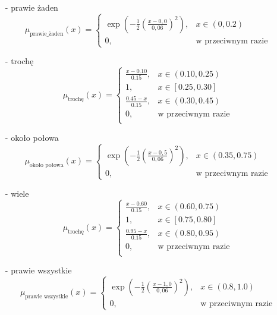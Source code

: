\documentclass{article}
\begin{document}
\begin{itemize}
    \item[-] prawie żaden
        \begin{equation}
            \mu_{\text{prawie\_żaden}}(x) =
        \begin{cases}
        \exp\left( -\frac{1}{2} \left( \frac{x - 0{,}0}{0,06} \right)^2 \right), & x \in (0, 0.2) \\
        0, & \text{w przeciwnym razie}
        \end{cases}
        \end{equation}
    \item[-] trochę
        \begin{equation}
            \mu_{\text{trochę}}(x) =
            \begin{cases}
            \frac{x - 0.10}{0.15}, & x \in (0.10, 0.25) \\
            1, & x \in [0.25, 0.30] \\
            \frac{0.45 - x}{0.15}, & x \in (0.30, 0.45)\\
            0, & \text{w przeciwnym razie} \\
            \end{cases}
        \end{equation}
    \item[-] około połowa
        \begin{equation}
        \mu_{\text{około połowa}}(x) =
        \begin{cases}
        \exp\left( -\frac{1}{2} \left( \frac{x - 0{,}5}{0,06} \right)^2 \right), & x \in (0.35, 0.75) \\
        0, & \text{w przeciwnym razie}
\end{cases}
        \end{equation}
    \item[-] wiele
        \begin{equation}
             \mu_{\text{trochę}}(x) =
            \begin{cases}
            \frac{x - 0.60}{0.15}, & x \in (0.60, 0.75) \\
            1, & x \in [0.75, 0.80] \\
            \frac{0.95 - x}{0.15}, & x \in (0.80, 0.95)\\
            0, & \text{w przeciwnym razie} \\
            \end{cases}
        \end{equation}
    \item[-] prawie wszystkie
        \begin{equation}
            \mu_{\text{prawie wszystkie}}(x) =
            \begin{cases}
            \exp\left( -\frac{1}{2} \left( \frac{x - 1{,}0}{0,06} \right)^2 \right), &  x \in (0.8, 1.0) \\
            0, & \text{w przeciwnym razie}
            \end{cases}
        \end{equation}
\end{itemize}
\end{document}
